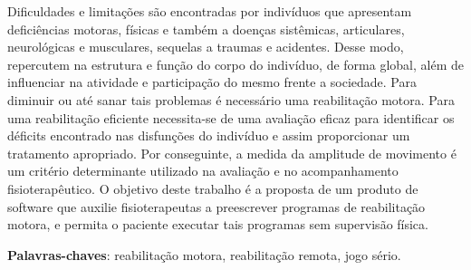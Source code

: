 \begin{resumo}

Dificuldades e limitações são encontradas por indivíduos que apresentam deficiências
 motoras, físicas e também a doenças sistêmicas, articulares, neurológicas e musculares,
 sequelas a traumas e acidentes. Desse modo, repercutem na estrutura e função do corpo
 do indivíduo, de forma global, além de influenciar na atividade e participação do
 mesmo frente a sociedade. Para diminuir ou até sanar tais problemas é necessário uma
 reabilitação motora. Para uma reabilitação eficiente necessita-se de uma avaliação
 eficaz para identificar os déficits encontrado nas disfunções do indivíduo e assim
proporcionar um tratamento apropriado. Por conseguinte, a medida da amplitude de
 movimento é um critério determinante utilizado na avaliação e no acompanhamento
 fisioterapêutico. O objetivo deste trabalho é a proposta de um produto de software
 que auxilie fisioterapeutas a preescrever programas de reabilitação motora,
  e permita o paciente executar tais programas sem supervisão física.
 \vspace{\onelineskip}

 \noindent
 \textbf{Palavras-chaves}: reabilitação motora, reabilitação remota, jogo sério.
\end{resumo}
